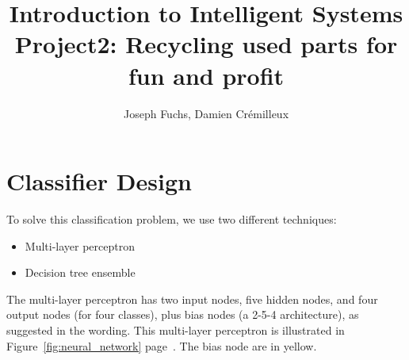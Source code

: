 \documentclass[]{article}
\title{Introduction to Intelligent Systems \\ Project2: Recycling used parts for fun and profit}
\author{Joseph Fuchs, Damien Crémilleux}
\begin{document}
\maketitle

\section{Classifier Design}
To solve this classification problem, we use two different techniques:
\begin{itemize}
\item Multi-layer perceptron
\item Decision tree ensemble
\end{itemize}

The multi-layer perceptron has two input nodes, five hidden nodes, and four output nodes (for four classes), plus bias nodes (a 2-5-4 architecture), as suggested in the wording. This multi-layer perceptron is illustrated in Figure~\ref{fig:neural_network} page~\pageref{fig:neural_network}. The bias node are in yellow.
\end{document}
